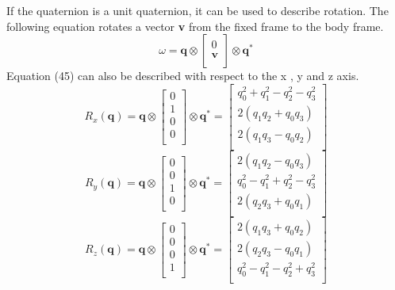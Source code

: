 If the quaternion is a unit quaternion, it can be used to describe rotation. The following equation rotates a vector \textbf{v} from the fixed frame to the body frame.
\begin{equation}
  \omega = \textbf{q} \otimes \begin{bmatrix}
    0 \\[0.3em]
    \textbf{v}\\[0.3em]
\end{bmatrix} \otimes \textbf{q}^*
\end{equation}
Equation (45) can also be described with respect to the x , y and z axis.
\begin{equation}
  R_x(\textbf{q}) = \textbf{q} \otimes \begin{bmatrix}
    0 \\[0.3em]
    1\\[0.3em]
    0 \\[0.3em]
    0\\[0.3em]
\end{bmatrix} \otimes \textbf{q}^* = \begin{bmatrix}
    q_0^2 + q_1^2 - q_2^2 - q_3^2 \\[0.3em]
    2(q_1q_2 + q_0q_3)\\[0.3em]
    2(q_1q_3 - q_0q_2) \\[0.3em]
\end{bmatrix}
\end{equation}
\begin{equation}
  R_y(\textbf{q}) = \textbf{q} \otimes \begin{bmatrix}
    0 \\[0.3em]
    0\\[0.3em]
    1 \\[0.3em]
    0\\[0.3em]
\end{bmatrix} \otimes \textbf{q}^* = \begin{bmatrix}
    2(q_1q_2 - q_0q_3)\\[0.3em]
    q_0^2 - q_1^2 + q_2^2 - q_3^2 \\[0.3em]
    2(q_2q_3 + q_0q_1) \\[0.3em]
\end{bmatrix}
\end{equation}
\begin{equation}
  R_z(\textbf{q}) = \textbf{q} \otimes \begin{bmatrix}
    0 \\[0.3em]
    0\\[0.3em]
    0 \\[0.3em]
    1\\[0.3em]
\end{bmatrix} \otimes \textbf{q}^* = \begin{bmatrix}
    2(q_1q_3 + q_0q_2)\\[0.3em]
    2(q_2q_3 - q_0q_1) \\[0.3em]
    q_0^2 - q_1^2 - q_2^2 + q_3^2 \\[0.3em]
\end{bmatrix}
\end{equation}
